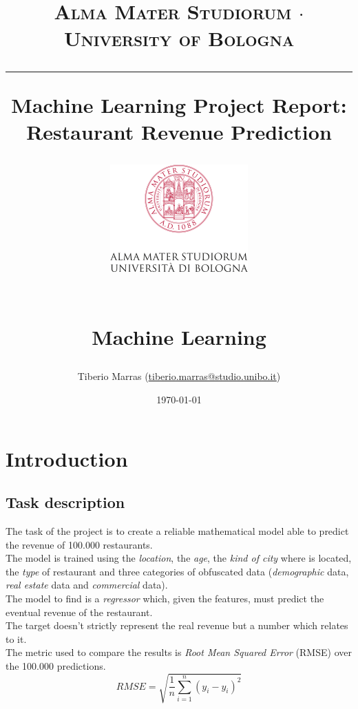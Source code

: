 \documentclass[a4paper,10pt]{report}
\begin{document}
\frenchspacing


\title{
  {{\large{\textsc{Alma Mater Studiorum $\cdot$ University of Bologna}}}}
  \rule{\textwidth}{0.4pt}\vspace{3mm}
  \textbf{Machine Learning Project Report: 
Restaurant Revenue Prediction}
  \begin{figure}[!htb]
    \centering
    \includegraphics[width = 150pt]{img/AlmaMaterLogo.png}
  \end{figure} \\
   Machine Learning
}

\author{ Tiberio Marras (\href{mailto:tiberio.marras@studio.unibo.it}{tiberio.marras@studio.unibo.it})}
\date{\today}
\maketitle
\newpage
\tableofcontents
\setcounter{tocdepth}{1}
\newpage
\maketitle
\chapter{Introduction}
\section{Task description}
The task of the project is to create a reliable mathematical model able to predict the revenue of 100.000 restaurants.\\
The model is trained using the \emph{location}, the \emph{age}, the \emph{kind of city} where is located, the \emph{type} of restaurant and three categories of obfuscated data (\emph{demographic} data, \emph{real estate} data and \emph{commercial} data).\\
The model to find is a \emph{regressor} which, given the features, must predict the eventual revenue of the restaurant.\\
The target doesn't strictly represent the real revenue but a number which relates to it.\\
The metric used to compare the results is \emph{Root Mean Squared Error} (RMSE) over the 100.000 predictions.
$$
RMSE = \sqrt{\frac{1}{n}\sum_{i=1}^{n}(y_{i} - \hat{y_{i}})^2}
$$
\end{document}
